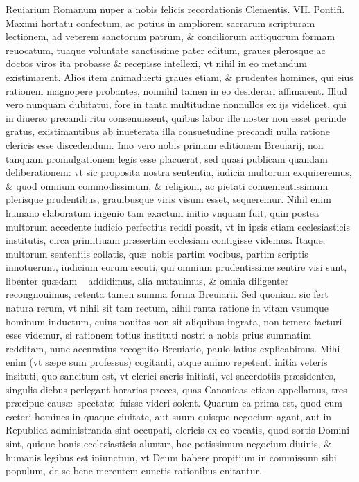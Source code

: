 \documentclass[a5paper,10pt]{book}
\def\ae{æ}
\begin{document}
Reuiarium Romanum nuper a nobis felicis recordationis Clementis. VII. Pontifi. Maximi hortatu confectum, ac potius in ampliorem sacrarum scripturam lectionem, ad veterem sanctorum patrum, \& conciliorum antiquorum formam reuocatum, tuaque voluntate sanctissime pater editum, graues plerosque ac doctos viros ita probasse \& recepisse intellexi, vt nihil in eo metandum existimarent.
Alios item animaduerti graues etiam, \& prudentes homines, qui eius rationem magnopere probantes, nonnihil tamen in eo desiderari affimarent.
Illud vero nunquam dubitatui, fore in tanta multitudine nonnullos ex ijs videlicet, qui in diuerso precandi ritu consenuissent, quibus labor ille noster non esset perinde gratus, existimantibus ab inueterata illa consuetudine precandi nulla ratione clericis esse discedendum.
Imo vero nobis primam editionem Breuiarij, non tanquam promulgationem legis esse placuerat, sed quasi publicam quandam deliberationem:
vt sic proposita nostra sententia, iudicia multorum exquireremus, \& quod omnium commodissimum, \& religioni, ac pietati conuenientissimum plerisque prudentibus, grauibusque viris visum esset, sequeremur.
Nihil enim humano elaboratum ingenio tam exactum initio vnquam fuit, quin postea multorum accedente iudicio perfectius reddi possit, vt in ipsis etiam ecclesiasticis institutis, circa primitiuam pr\ae sertim ecclesiam contigisse videmus.
Itaque, multorum sententiis 
collatis, qu\ae \ nobis partim vocibus, partim scriptis innotuerunt, iudicium eorum secuti, qui omnium prudentissime sentire visi sunt, libenter qu\ae dam \ %
addidimus, alia mutauimus, \& omnia diligenter recongnouimus, retenta tamen summa forma Breuiarii.
Sed quoniam sic fert natura rerum, vt nihil sit tam rectum, nihil ranta ratione in vitam vsumque hominum inductum, cuius nouitas non sit aliquibus ingrata, non temere facturi esse videmur, si rationem totius instituti nostri a nobis prius summatim redditam, nunc accuratius recognito Breuiario, paulo latius explicabimus.
Mihi enim (vt s\ae pe sum professus) cogitanti, atque animo repetenti initia veteris insituti, quo sancitum est, vt clerici sacris initiati, vel sacerdotiis pr\ae sidentes, singulis diebus perlegant horarias preces, quas Canonicas etiam appellamus, tres pr\ae cipue caus\ae \ spectat\ae \ fuisse videri solent.
Quarum ea prima est, quod cum c\ae teri homines in quaque ciuitate, aut suum quisque negocium agant, aut in Republica administranda sint occupati, clericis ex eo vocatis, quod sortis Domini sint, quique bonis ecclesiasticis aluntur, hoc potissimum negocium diuinis, \& humanis legibus est iniunctum, vt Deum habere propitium in commissum sibi populum, de se bene merentem cunctis rationibus enitantur.
\end{document}
